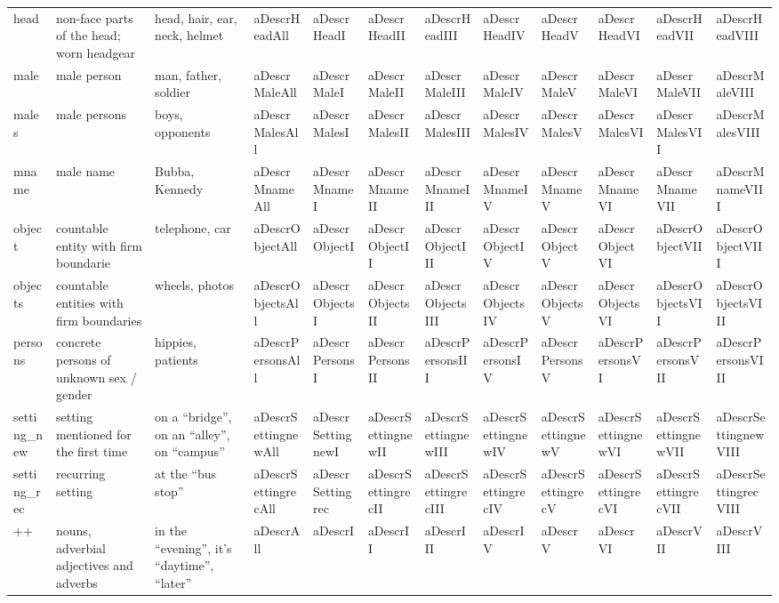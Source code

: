 \documentclass[english]{article}
\begin{document}
\begin{table}[t]
\begin{tabular}{llllllllllll}
head & non-face parts of the head; worn headgear & head, hair, ear, neck, helmet & aDescrHeadAll & aDescrHeadI & aDescrHeadII & aDescrHeadIII & aDescrHeadIV & aDescrHeadV & aDescrHeadVI & aDescrHeadVII & aDescrHeadVIII \tabularnewline
male & male person & man, father, soldier & aDescrMaleAll & aDescrMaleI & aDescrMaleII & aDescrMaleIII & aDescrMaleIV & aDescrMaleV & aDescrMaleVI & aDescrMaleVII & aDescrMaleVIII \tabularnewline
males & male persons & boys, opponents & aDescrMalesAll & aDescrMalesI & aDescrMalesII & aDescrMalesIII & aDescrMalesIV & aDescrMalesV & aDescrMalesVI & aDescrMalesVII & aDescrMalesVIII \tabularnewline
mname & male name & Bubba, Kennedy & aDescrMnameAll & aDescrMnameI & aDescrMnameII & aDescrMnameIII & aDescrMnameIV & aDescrMnameV & aDescrMnameVI & aDescrMnameVII & aDescrMnameVIII \tabularnewline
object & countable entity with firm boundarie & telephone, car & aDescrObjectAll & aDescrObjectI & aDescrObjectII & aDescrObjectIII & aDescrObjectIV & aDescrObjectV & aDescrObjectVI & aDescrObjectVII & aDescrObjectVIII \tabularnewline
objects & countable entities with firm boundaries &  wheels, photos & aDescrObjectsAll & aDescrObjectsI & aDescrObjectsII & aDescrObjectsIII & aDescrObjectsIV & aDescrObjectsV & aDescrObjectsVI & aDescrObjectsVII & aDescrObjectsVIII \tabularnewline
persons & concrete persons of unknown sex / gender & hippies, patients & aDescrPersonsAll & aDescrPersonsI & aDescrPersonsII & aDescrPersonsIII & aDescrPersonsIV & aDescrPersonsV & aDescrPersonsVI & aDescrPersonsVII & aDescrPersonsVIII \tabularnewline
setting\_new & setting mentioned for the first time &  on a ``bridge'', on an ``alley'', on ``campus'' & aDescrSettingnewAll & aDescrSettingnewI & aDescrSettingnewII & aDescrSettingnewIII & aDescrSettingnewIV & aDescrSettingnewV & aDescrSettingnewVI & aDescrSettingnewVII & aDescrSettingnewVIII \tabularnewline
setting\_rec & recurring setting & at the ``bus stop'' & aDescrSettingrecAll & aDescrSettingrec & aDescrSettingrecII & aDescrSettingrecIII & aDescrSettingrecIV & aDescrSettingrecV & aDescrSettingrecVI & aDescrSettingrecVII & aDescrSettingrecVIII \tabularnewline
++ & nouns, adverbial adjectives and adverbs & in the ``evening'', it's ``daytime'', ``later'' &  aDescrAll & aDescrI & aDescrII & aDescrIII & aDescrIV & aDescrV & aDescrVI & aDescrVII & aDescrVIII \tabularnewline
\bottomrule
\end{tabular}
\end{table}
\end{document}
